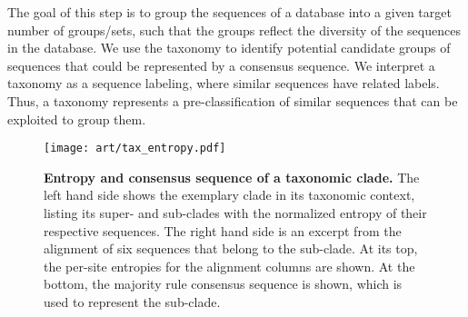 The goal of this step is to group the sequences of a database into a given target number of groups/sets,
such that the groups reflect the diversity of the sequences in the database.
We use the taxonomy to identify potential candidate groups of sequences that could be represented by a consensus sequence.
We interpret a taxonomy as a sequence labeling, where similar sequences have related labels.
Thus, a taxonomy represents a pre-classification of similar sequences that can be exploited to group them.

\begin{figure}[hpbt]
    \centering
    \texttt{[image: art/tax\_entropy.pdf]}
    \caption[Entropy and consensus sequence of a taxonomic clade]{
        \textbf{Entropy and consensus sequence of a taxonomic clade.}
        The left hand side shows the exemplary clade  in its taxonomic context,
        listing its super- and sub-clades with the normalized entropy of their respective sequences.
        The right hand side is an excerpt from the alignment
        of six sequences that belong to the  sub-clade.
        At its top, the per-site entropies for the alignment columns are shown.
        At the bottom, the majority rule consensus sequence is shown, which is used to represent the sub-clade.
    }
    \label{fig:tax_entropy}
\end{figure}

